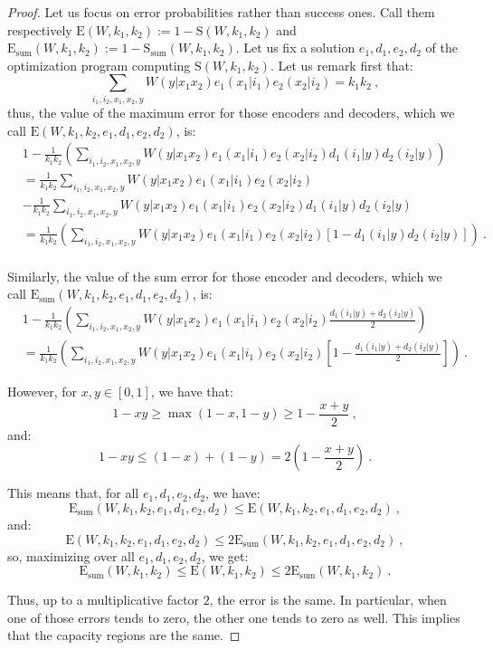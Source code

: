 \begin{proof}
  Let us focus on error probabilities rather than success ones. Call them respectively $\mathrm{E}(W,k_1,k_2) := 1-\mathrm{S}(W,k_1,k_2)$ and $\mathrm{E}_{\text{sum}}(W,k_1,k_2) := 1-\mathrm{S}_{\text{sum}}(W,k_1,k_2)$. Let us fix a solution $e_1,d_1,e_2,d_2$ of the optimization program computing $\mathrm{S}(W,k_1,k_2)$. Let us remark first that:
  \[ \sum_{i_1,i_2,x_1,x_2,y} W(y|x_1x_2)e_1(x_1|i_1)e_2(x_2|i_2) = k_1k_2\ , \]
  thus, the value of the maximum error for those encoders and decoders, which we call $\mathrm{E}(W,k_1,k_2,e_1,d_1,e_2,d_2)$, is:
\begin{equation}
  \begin{aligned}
    & 1 -  \frac{1}{k_1k_2}\left(\sum_{i_1,i_2,x_1,x_2,y} W(y|x_1x_2)e_1(x_1|i_1)e_2(x_2|i_2)d_1(i_1|y)d_2(i_2|y)\right)\\
    &=\frac{1}{k_1k_2}\sum_{i_1,i_2,x_1,x_2,y} W(y|x_1x_2)e_1(x_1|i_1)e_2(x_2|i_2)\\
    &-\frac{1}{k_1k_2}\sum_{i_1,i_2,x_1,x_2,y} W(y|x_1x_2)e_1(x_1|i_1)e_2(x_2|i_2)d_1(i_1|y)d_2(i_2|y)\\
    &=\frac{1}{k_1k_2}\left(\sum_{i_1,i_2,x_1,x_2,y} W(y|x_1x_2)e_1(x_1|i_1)e_2(x_2|i_2)\left[1-d_1(i_1|y)d_2(i_2|y)\right]\right) \ .\\
  \end{aligned}
\end{equation}

Similarly, the value of the sum error for those encoder and decoders, which we call $\mathrm{E}_{\text{sum}}(W,k_1,k_2,e_1,d_1,e_2,d_2)$, is:
\begin{equation}
  \begin{aligned}
    &1 -  \frac{1}{k_1k_2}\left(\sum_{i_1,i_2,x_1,x_2,y} W(y|x_1x_2)e_1(x_1|i_1)e_2(x_2|i_2)\frac{d_1(i_1|y)+d_2(i_2|y)}{2}\right)\\
    &= \frac{1}{k_1k_2}\left(\sum_{i_1,i_2,x_1,x_2,y} W(y|x_1x_2)e_1(x_1|i_1)e_2(x_2|i_2)\left[1-\frac{d_1(i_1|y)+d_2(i_2|y)}{2}\right]\right) \ .
  \end{aligned}
\end{equation}

However, for $x,y \in [0,1]$, we have that:
\[1-xy \geq \max\left(1-x,1-y\right) \geq 1-\frac{x+y}{2} \ , \]
and:
\[1-xy \leq (1-x) + (1-y) = 2  \left(1-\frac{x+y}{2}\right) \ . \]

This means that, for all $e_1,d_1,e_2,d_2$, we have:
\[ \mathrm{E}_{\text{sum}}(W,k_1,k_2,e_1,d_1,e_2,d_2) \leq \mathrm{E}(W,k_1,k_2,e_1,d_1,e_2,d_2) \ ,\]
and:
\[ \mathrm{E}(W,k_1,k_2,e_1,d_1,e_2,d_2) \leq 2\mathrm{E}_{\text{sum}}(W,k_1,k_2,e_1,d_1,e_2,d_2) \ ,\]
so, maximizing over all $e_1,d_1,e_2,d_2$, we get:
\[ \mathrm{E}_{\text{sum}}(W,k_1,k_2) \leq \mathrm{E}(W,k_1,k_2) \leq 2\mathrm{E}_{\text{sum}}(W,k_1,k_2) \ .\]

Thus, up to a multiplicative factor $2$, the error is the same. In particular, when one of those errors tends to zero, the other one tends to zero as well. This implies that the capacity regions are the same.
\end{proof}

